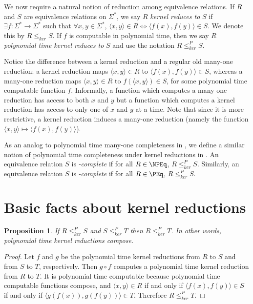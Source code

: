 \documentclass{article}
\newtheorem{proposition}[proposition]{Proposition}
\theoremstyle{definition} \newtheorem{definition}[definition]{Definition}
\newcommand{\kr}{\leq^{P}_{ker}} %
\newcommand{\krnt}{\leq_{ker}} %
\newcommand{\defn}[1]{\emph{#1}} %
\newcommand{\pair}[2]{\langle#1,#2\rangle} %
\begin{document}
We now require a natural notion of reduction among equivalence relations.
If $R$ and $S$ are equivalence relations on $\Sigma^*$, we say $R$ \defn{kernel reduces to} $S$ if $\exists f\colon\Sigma^*\to\Sigma^*$ such that $\forall x,y\in\Sigma^*$, $\pair{x}{y}\in R\iff \pair{f(x)}{f(y)}\in S$.
We denote this by $R\krnt S$.
If $f$ is computable in polynomial time, then we say $R$ \defn{polynomial time kernel reduces to} $S$ and use the notation $R\kr S$.

Notice the difference between a kernel reduction and a regular old many-one reduction: a kernel reduction maps $\pair{x}{y}\in R$ to $\pair{f(x)}{f(y)}\in S$, whereas a many-one reduction maps $\pair{x}{y}\in R$ to $f(\pair{x}{y})\in S$, for some polynomial time computable function $f$.
Informally, a function which computes a many-one reduction has access to both $x$ and $y$ but a function which computes a kernel reduction has access to only one of $x$ and $y$ at a time.
Note that since it is more restrictive, a kernel reduction induces a many-one reduction (namely the function $\pair{x}{y}\mapsto\pair{f(x)}{f(y)}$).

As an analog to polynomial time many-one completeness in \NP, we define a similar notion of polynomial time completeness under kernel reductions in \NPEq.
An equivalence relation $S$ is \defn{\NPEq-complete} if for all $R\in\NPEq$, $R\kr S$.
Similarly, an equivalence relation $S$ is \defn{\PEq-complete} if for all $R\in\PEq$, $R\kr S$.

\section{Basic facts about kernel reductions}
\begin{proposition}\label{prop:compose}
  If $R\kr S$ and $S\kr T$ then $R\kr T$. In other words, polynomial time kernel reductions compose.
\end{proposition}
\begin{proof}
  Let $f$ and $g$ be the polynomial time kernel reductions from $R$ to $S$ and from $S$ to $T$, respectively.
  Then $g\circ f$ computes a polynomial time kernel reduction from $R$ to $T$.
  It is polynomial time computable because polynomial time computable functions compose, and $\pair{x}{y}\in R$ if and only if $\pair{f(x)}{f(y)}\in S$ if and only if $\pair{g(f(x))}{g(f(y))}\in T$.
  Therefore $R\kr T$.
\end{proof}
\end{document}

